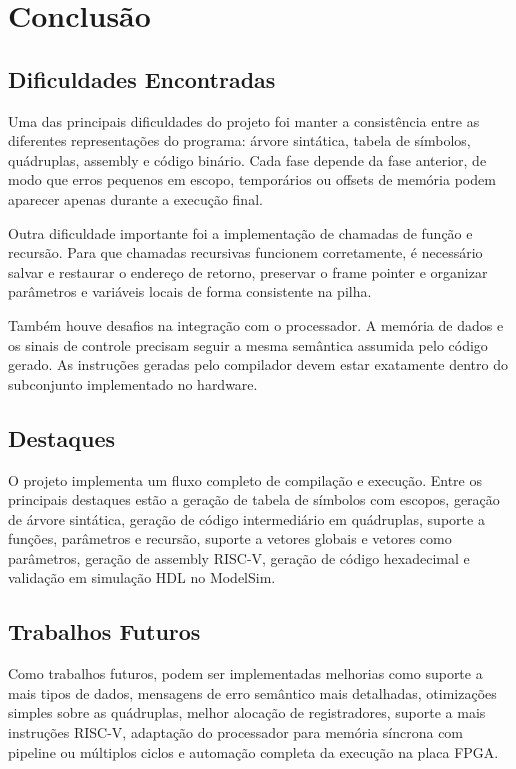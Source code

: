 \documentclass[12pt,a4paper]{report}
\begin{document}
\chapter{Conclusão}

\section{Dificuldades Encontradas}

Uma das principais dificuldades do projeto foi manter a consistência entre as diferentes representações do programa: árvore sintática, tabela de símbolos, quádruplas, assembly e código binário. Cada fase depende da fase anterior, de modo que erros pequenos em escopo, temporários ou offsets de memória podem aparecer apenas durante a execução final.

Outra dificuldade importante foi a implementação de chamadas de função e recursão. Para que chamadas recursivas funcionem corretamente, é necessário salvar e restaurar o endereço de retorno, preservar o frame pointer e organizar parâmetros e variáveis locais de forma consistente na pilha.

Também houve desafios na integração com o processador. A memória de dados e os sinais de controle precisam seguir a mesma semântica assumida pelo código gerado. As instruções geradas pelo compilador devem estar exatamente dentro do subconjunto implementado no hardware.

\section{Destaques}

O projeto implementa um fluxo completo de compilação e execução. Entre os principais destaques estão a geração de tabela de símbolos com escopos, geração de árvore sintática, geração de código intermediário em quádruplas, suporte a funções, parâmetros e recursão, suporte a vetores globais e vetores como parâmetros, geração de assembly RISC-V, geração de código hexadecimal e validação em simulação HDL no ModelSim.

\section{Trabalhos Futuros}

Como trabalhos futuros, podem ser implementadas melhorias como suporte a mais tipos de dados, mensagens de erro semântico mais detalhadas, otimizações simples sobre as quádruplas, melhor alocação de registradores, suporte a mais instruções RISC-V, adaptação do processador para memória síncrona com pipeline ou múltiplos ciclos e automação completa da execução na placa FPGA.
\end{document}
